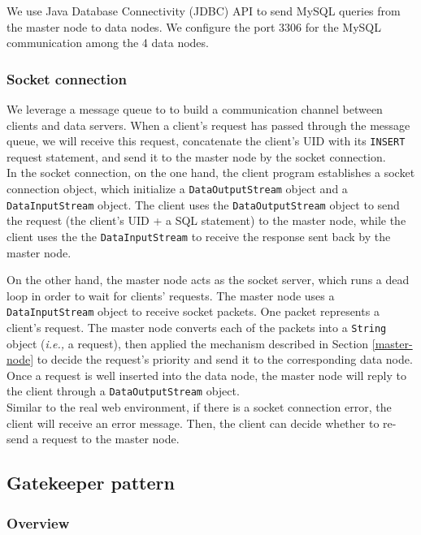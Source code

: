 \documentclass{article}
\begin{document}
We use Java Database Connectivity (JDBC) API to send MySQL queries from the master node to data nodes. We configure the port 3306 for the MySQL communication among the 4 data nodes.

\subsubsection{Socket connection}
We leverage a message queue to to build a communication channel between clients and data servers. When a client's request has passed through the message queue, we will receive this request, concatenate the client's UID with its \texttt{INSERT} request statement, and send it to the master node by the socket connection.\\

In the socket connection, on the one hand, the client program establishes a socket connection object, which initialize a \texttt{DataOutputStream} object and a \texttt{DataInputStream} object. The client uses the \texttt{DataOutputStream} object to send the request (the client's UID + a SQL statement) to the master node, while the client uses the the \texttt{DataInputStream} to receive the response sent back by the master node.

On the other hand, the master node acts as the socket server, which runs a dead loop in order to wait for clients' requests. The master node uses a \texttt{DataInputStream} object to receive socket packets. One packet represents a client's request. The master node converts each of the packets into a \texttt{String} object (\emph{i.e.,} a request), then applied the mechanism described in Section \ref{master-node} to decide the request's priority and send it to the corresponding data node. Once a request is well inserted into the data node, the master node will reply to the client through a \texttt{DataOutputStream} object.\\

Similar to the real web environment, if there is a socket connection error, the client will receive an error message. Then, the client can decide whether to re-send a request to the master node.

\subsection{Gatekeeper pattern}
\subsubsection{Overview}
\end{document}

